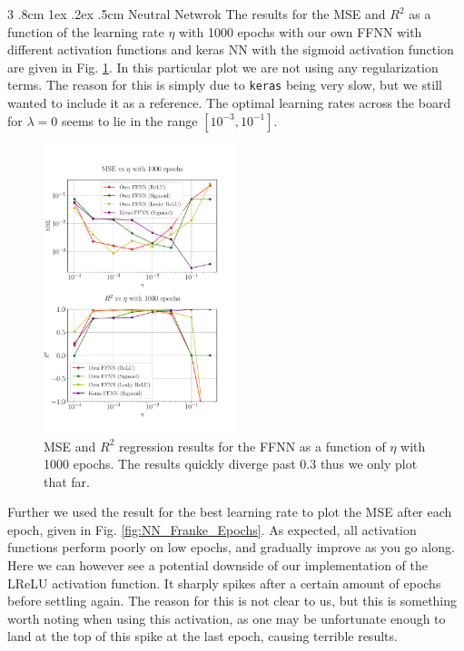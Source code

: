 \documentclass[%
reprint,s
amsmath,amssymb,
aps,
]{revtex4-2}
\makeatletter
\renewcommand{\subsubsection}{%
	\@startsection
	{subsubsection}%
	{3}%
	{\z@}%
	{.8cm \@plus1ex \@minus .2ex}%
	{.5cm}%
	{\normalfont\small\centering}%
}
\makeatother
\begin{document}
\subsubsection{Neutral Netwrok}
The results for the MSE and $R^2$ as a function of the learning rate $\eta$ with 1000 epochs with our own FFNN with different activation functions and keras NN with the sigmoid activation function are given in Fig. \ref{fig:NN_Franke_LR_1000}. In this particular plot we are not using any regularization terms. The reason for this is simply due to \texttt{keras} being very slow, but we still wanted to include it as a reference. The optimal learning rates across the board for $\lambda=0$ seems to lie in the range $[10^{-3},10^{-1}]$.
\begin{figure}[ht!]
	\includegraphics[width=0.5\textwidth]{Python/Figures/NN_MSE_R2_Franke_LearningRate_Epochs1000.pdf}
	\caption{MSE and $R^2$ regression results for the FFNN as a function of $\eta$ with 1000 epochs. The results quickly diverge past $0.3$ thus we only plot that far.}
	\label{fig:NN_Franke_LR_1000}
\end{figure}

Further we used the result for the best learning rate to plot the MSE after each epoch, given in Fig. \ref{fig:NN_Franke_Epochs}. As expected, all activation functions perform poorly on low epochs, and gradually improve as you go along. Here we can however see a potential downside of our implementation of the LReLU activation function. It sharply spikes after a certain amount of epochs before settling again. The reason for this is not clear to us, but this is something worth noting when using this activation, as one may be unfortunate enough to land at the top of this spike at the last epoch, causing terrible results. 
\end{document}
